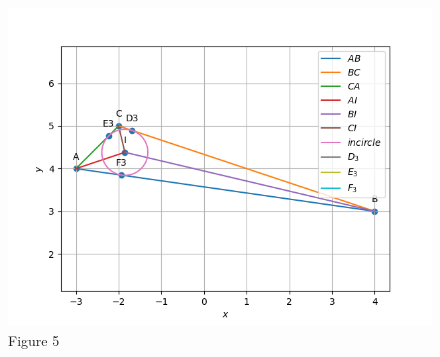 \documentclass[journal,12pt,twocolumn]{IEEEtran}
\theoremstyle{remark}
\begin{document}
\begin{figure}[h!]
\centering

\includegraphics[width=\columnwidth]{./figs/fig21.png}
\caption{Figure 5}
\label{fig:Incenter}

\end{figure}
\end{document}
